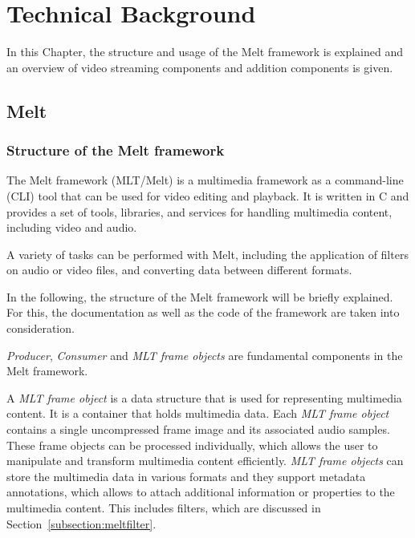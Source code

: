 \documentclass[../MasterThesis.tex]{subfiles}
\begin{document}
	
	

\newpage

\section{Technical Background} \label{section:technicalbackground}


In this Chapter, the structure and usage of the Melt framework is explained and an overview of video streaming components and addition components is given.


\subsection{Melt} \label{subsection:melt}
\subsubsection*{Structure of the Melt framework}

The Melt framework (MLT/Melt) is a multimedia framework as a command-line (CLI) tool that can be used for video editing and playback. It is written in C and provides a set of tools, libraries, and services for handling multimedia content, including video and audio.~\cite{melt} 


A variety of tasks can be performed with Melt, including the application of filters on audio or video files, and converting data between different formats. 

In the following, the structure of the Melt framework will be briefly explained. For this, the documentation as well as the code of the framework are taken into consideration.~\cite{melt, melt_code}

\textit{Producer}, \textit{Consumer} and \textit{MLT frame objects} are fundamental components in the Melt framework.

A \textit{MLT frame object} is a data structure that is used for representing multimedia content. 
It is a container that holds multimedia data. Each \textit{MLT frame object} contains a single uncompressed frame image and its associated audio samples. These frame objects can be processed individually, which allows the user to manipulate and transform multimedia content efficiently.
\textit{MLT frame objects} can store the multimedia data in various formats and they support metadata annotations, which allows to attach additional information or properties to the multimedia content. This includes filters, which are discussed in Section~\ref{subsection:meltfilter}.
\end{document}
